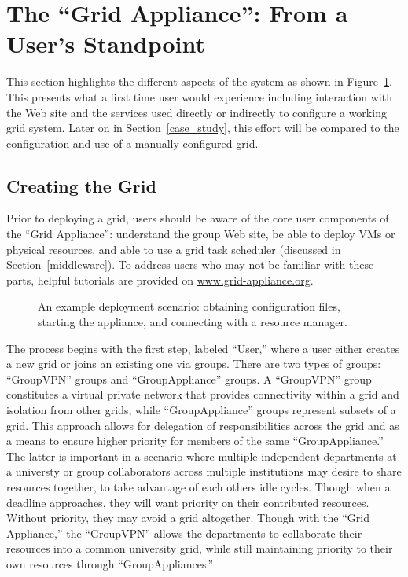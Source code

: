 \documentclass[conference]{IEEEtran}
\begin{document}
\section{The ``Grid Appliance'': From a User's Standpoint}
\label{system}

This section highlights the different aspects of the system as shown in
Figure~\ref{fig:system}.  This presents what a first time user would experience
including interaction with the Web site and the services used directly or
indirectly to configure a working grid system.  Later on in
Section~\ref{case_study}, this effort will be compared to the configuration and
use of a manually configured grid.

\subsection{Creating the Grid}

Prior to deploying a grid, users should be aware of the core user components of
the ``Grid Appliance'': understand the group Web site, be able to deploy VMs or
physical resources, and able to use a grid task scheduler (discussed in
Section~\ref{middleware}).  To address users who may not be familiar with these
parts, helpful tutorials are provided on \url{www.grid-appliance.org}.  

\begin{figure}[ht]
\centering
{}
\caption{An example deployment scenario:  obtaining configuration files,
starting the appliance, and connecting with a resource manager.}
\label{fig:system}
\end{figure}

The process begins with the first step, labeled ``User,'' where a user either
creates a new grid or joins an existing one via groups.  There are two types of
groups: ``GroupVPN'' groups and ``GroupAppliance'' groups. A ``GroupVPN'' group
constitutes a virtual private network that provides connectivity within a grid
and isolation from other grids, while ``GroupAppliance'' groups represent
subsets of a grid.  This approach allows for delegation of responsibilities
across the grid and as a means to ensure higher priority for members of the
same ``GroupAppliance.'' The latter is important in a scenario where multiple
independent departments at a universty or group collaborators across multiple
institutions may desire to share resources together, to take advantage of each
others idle cycles.  Though when a deadline approaches, they will want priority
on their contributed resources.  Without priority, they may avoid a grid
altogether.  Though with the ``Grid Appliance,'' the ``GroupVPN'' allows the
departments to collaborate their resources into a common university grid, while
still maintaining priority to their own resources through ``GroupAppliances.''
\end{document}

